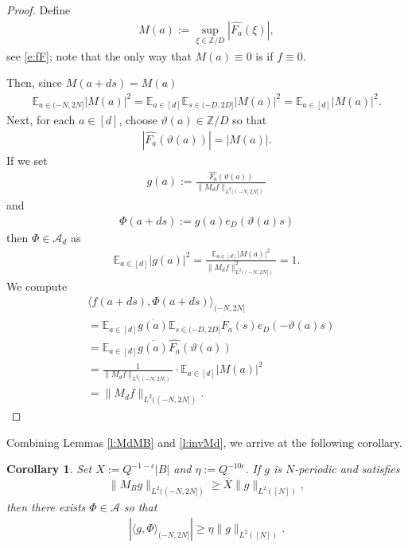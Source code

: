 \documentclass[12pt]{amsart}
\numberwithin{equation}{section}
\newtheorem{cor}[theorem]{Corollary}
\theoremstyle{definition}
\begin{document}
\begin{proof}
    Define
    \begin{align}
        M(a) := \sup_{\xi \in \mathbb{Z}/D} |\widehat{F_a}(\xi)|,
    \end{align}
see \eqref{e:fF}; note that the only way that $M(a) \equiv 0$ is if $f \equiv 0$.
    
Then, since $M(a+ds) = M(a)$
\begin{align}
    \mathbb{E}_{a \in (-N,2N]} |M(a)|^2 = \mathbb{E}_{a \in [d]} \mathbb{E}_{s \in (-D,2D]} |M(a)|^2 = \mathbb{E}_{a \in [d]} |M(a)|^2.
\end{align}
Next, for each $a \in [d]$, choose $\vartheta(a) \in \mathbb{Z}/D$ so that
\begin{align}
    |\widehat{F_a}(\vartheta(a))| = |M(a)|.
\end{align}
If we set
\begin{align}
    g(a) := \frac{\widehat{F_a}(\vartheta(a))}{\| M_d f \|_{L^2((-N,2N])} }
\end{align}
and
\begin{align}
    \Phi(a+ds) := g(a) e_D(\vartheta(a) s)
\end{align}
    then $\Phi \in \mathcal{A}_d$ as
    \begin{align}
        \mathbb{E}_{a \in [d]} |g(a)|^2 = \frac{\mathbb{E}_{a \in [d]} |M(a)|^2 }{ \| M_d f \|_{L^2( (-N,2N] )}^2} = 1.
    \end{align}
We compute
\begin{align}
    &\langle f(a+ds), \Phi(a+ds) \rangle_{(-N,2N] }\\
    & = \mathbb{E}_{a \in [d]} \overline{g(a)} \mathbb{E}_{s \in (-D,2D]} F_a(s) e_D(-\vartheta(a)s) \\
    & = \mathbb{E}_{a \in [d]} \overline{g(a)} \widehat{F_a}(\vartheta(a)) \\
    & = \frac{1}{\| M_d f \|_{L^2( (-N,2N] )}} \cdot \mathbb{E}_{a \in [d]} |M(a)|^2 \\
    &= \|M_d f \|_{L^2( (-N,2N])}.
\end{align}
    
\end{proof}

Combining Lemmas \ref{l:MdMB} and \ref{l:invMd}, we arrive at the following corollary.
\begin{cor}\label{c:invMB}
    Set $X := Q^{-1-\epsilon} |B|$ and $\eta := Q^{-10\epsilon}$. If $g$ is $N$-periodic and satisfies
    \begin{align}
        \| M_B g \|_{L^2((-N,2N])} \geq X \|g \|_{L^2([N])},
    \end{align}
then there exists $\Phi \in \mathcal{A}$ so that
\begin{align}
    |\langle g, \Phi \rangle_{ (-N,2N] }| \geq \eta \| g \|_{L^2([N])}.
\end{align}
    \end{cor}
\end{document}
